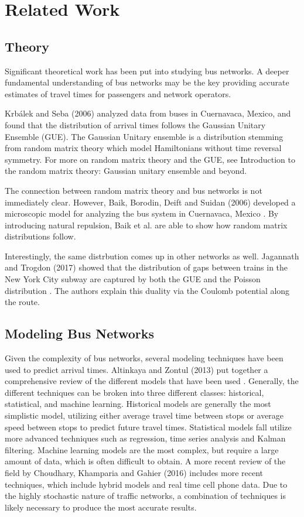 \chapter{Related Work}

\section{Theory}

Significant theoretical work has been put into studying bus networks.
A deeper fundamental understanding of bus networks may be the key providing accurate estimates of travel times for passengers and network operators.

Krb{\'a}lek and Seba (2006) analyzed data from buses in Cuernavaca, Mexico, and found that the distribution of arrival times follows the Gaussian Unitary Ensemble (GUE)\cite{krbalek2000statistical}.
The Gaussian Unitary ensemble is a distribution stemming from random matrix theory which model Hamiltonians without time reversal symmetry.
For more on random matrix theory and the GUE, see Introduction to the random matrix theory: Gaussian unitary ensemble and beyond\cite{fyodorov2005introduction}.

The connection between random matrix theory and bus networks is not immediately clear.
However, Baik, Borodin, Deift and Suidan (2006) developed a microscopic model for analyzing the bus system in Cuernavaca, Mexico \cite{baik2006model}.
By introducing natural repulsion, Baik et al. are able to show how random matrix distributions follow.

Interestingly, the same distrbution comes up in other networks as well.
Jagannath and Trogdon (2017) showed that the distribution of gaps between trains in the New York City subway are captured by both the GUE and the Poisson distribution \cite{jagannath2017random}.
The authors explain this duality via the Coulomb potential along the route.

\section{Modeling Bus Networks}

Given the complexity of bus networks, several modeling techniques have been used to predict arrival times.
Altinkaya and Zontul (2013) put together a comprehensive review of the different models that have been used \cite{altinkaya2013urban}.
Generally, the different techniques can be broken into three different classes: historical, statistical, and machine learning.
Historical models are generally the most simplistic model, utilizing either average travel time between stops or average speed between stops to predict future travel times.
Statistical models fall utilize more advanced techniques such as regression, time series analysis and Kalman filtering.
Machine learning models are the most complex, but require a large amount of data, which is often difficult to obtain.
A more recent review of the field by Choudhary, Khamparia and Gahier (2016) includes more recent techniques, which include hybrid models and real time cell phone data\cite{choudhary2016real}.
Due to the highly stochastic nature of traffic networks, a combination of techniques is likely necessary to produce the most accurate results.


